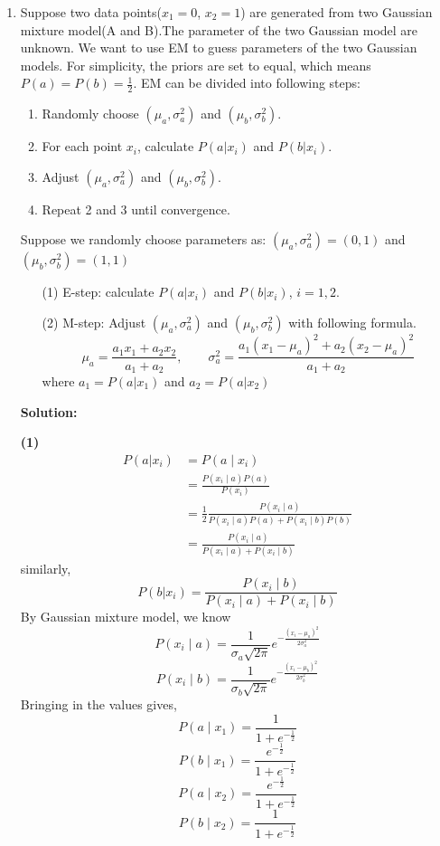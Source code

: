 \documentclass[10pt]{article}
\begin{document}
\begin{enumerate}
	\item {}
	      Suppose two data points($x_1 = 0$, $x_2 = 1$) are generated from two Gaussian mixture model(A and B).The parameter of the two Gaussian model are unknown. We want to use EM to guess parameters of the two Gaussian models. For simplicity, the priors are set to equal, which means $P(a) = P(b) = \frac{1}{2}$.
	      EM can be divided into following steps:
	      \begin{enumerate}
		      \item Randomly choose $(\mu_a, \sigma_a^2)$ and $(\mu_b, \sigma_b^2)$.
		      \item For each point $x_i$, calculate $P(a|x_i)$ and $P(b|x_i)$.
		      \item Adjust $(\mu_a, \sigma_a^2)$ and $(\mu_b, \sigma_b^2)$.
		      \item Repeat 2 and 3 until convergence.
	      \end{enumerate}
	      Suppose we randomly choose parameters as: $(\mu_a, \sigma_a^2) = (0, 1)$ and $(\mu_b, \sigma_b^2) = (1, 1)$

	      \begin{enumerate}
		      \item[(1)] E-step: calculate $P(a|x_i)$ and $P(b|x_i)$, $i = 1, 2$.\\
		      \item[(2)] M-step: Adjust $(\mu_a, \sigma_a^2)$ and $(\mu_b, \sigma_b^2)$ with following formula. \\
		            $$\mu_a = \frac{a_1x_1 + a_2x_2}{a_1 + a_2}, \qquad \sigma_a^2 = \frac{a_1(x_1-\mu_a)^2 + a_2(x_2-\mu_a)^2}{a_1 + a_2}$$
		            where $a_1 = P(a|x_1)$ and $a_2 = P(a|x_2)$\\
	      \end{enumerate}
\textbf{Solution:}
	\item[\textbf{(1)}]
		$$
		\begin{aligned}
		P(a|x_i)&=P\left(a \mid x_{i}\right)
		\\&=\frac{P\left(x_{i} \mid a\right)  P(a)}{P\left(x_{i}\right)}
		\\&=\frac{1}{2}\frac{P\left(x_{i} \mid a\right)}{P\left(x_{i} \mid a\right)  P(a)+P\left(x_{i} \mid b\right)  P(b)}
		\\&=\frac{P\left(x_{i} \mid a\right)}{P\left(x_{i} \mid a\right)+P\left(x_{i} \mid b\right)}
		\end{aligned}
		$$
	    similarly,$$P(b|x_i)=\frac{P\left(x_{i} \mid b\right)}{P\left(x_{i} \mid a\right)+P\left(x_{i} \mid b\right)}$$
		By Gaussian mixture model, we know
		$$P\left(x_{i} \mid a\right)=\frac{1}{\sigma_a \sqrt{2 \pi}} e^{-\frac{(x_i-\mu_a)^{2}}{2 \sigma_a^{2}}}$$
		$$P\left(x_{i} \mid b\right)=\frac{1}{\sigma_b \sqrt{2 \pi}} e^{-\frac{(x_i-\mu_b)^{2}}{2 \sigma_b^{2}}}$$
		Bringing in the values gives,
		$$P\left(a \mid x_{1}\right)=\frac{1}{1+e^{-\frac{1}{2}}}$$
		$$P\left(b \mid x_{1}\right)=\frac{e^{-\frac{1}{2}}}{1+e^{-\frac{1}{2}}}$$
		$$P\left(a \mid x_{2}\right)=\frac{e^{-\frac{1}{2}}}{1+e^{-\frac{1}{2}}}$$
		$$P\left(b \mid x_{2}\right)=\frac{1}{1+e^{-\frac{1}{2}}}$$


\end{enumerate}
\end{document}
